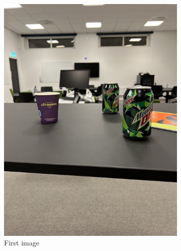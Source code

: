 \documentclass{article}
\begin{document}
    \begin{figure}[H]
        \centering
        \begin{subfigure}{0.32\textwidth}
            \centering
            \includegraphics[width=1\textwidth]{im1.jpg}
            \caption{First image}
            \label{fig:sub:flow-first-frame}
        \end{subfigure}
        \begin{subfigure}{0.32\textwidth}
            \centering

\end{subfigure}
\end{figure}
\end{document}
